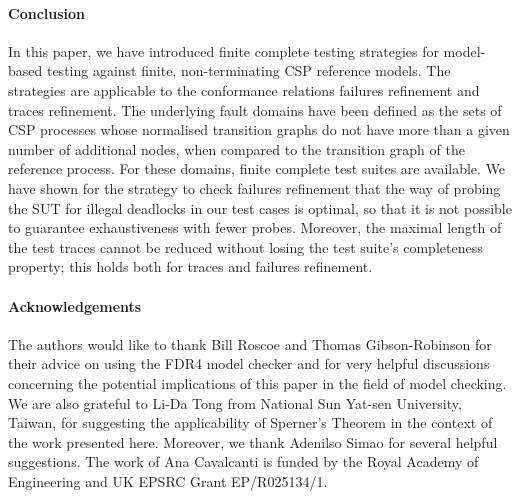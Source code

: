 \documentclass[3p,times]{elsarticle}
\begin{document}
\paragraph{Conclusion}
In this paper, we have introduced finite complete testing strategies for
model-based testing against finite, non-terminating CSP reference models. The
strategies are applicable to the conformance relations failures refinement
and traces refinement. The underlying fault domains have been defined as the
sets of CSP processes whose normalised transition graphs do not have more
than a given number of additional nodes, when compared to the transition
graph of the reference process. For these domains, finite complete test
suites are available. We have shown for the strategy to check failures
refinement that the way of probing the SUT for illegal deadlocks in our test
cases is optimal, so that it is not possible to guarantee exhaustiveness with
fewer probes. Moreover, the maximal length of the test traces cannot be
reduced without losing the test suite's completeness property; this holds
both for traces and failures refinement.


\paragraph{Acknowledgements}
The authors would like to thank Bill Roscoe and Thomas Gibson-Robinson for
their advice on using the FDR4 model checker and for very helpful discussions
concerning the potential implications of this paper in the field of model
checking. We are also grateful to Li-Da Tong from National Sun Yat-sen
University, Taiwan, for suggesting the applicability of Sperner's Theorem in
the context of the work presented here. Moreover, we thank Adenilso Simao for
several helpful suggestions. The work of Ana Cavalcanti is funded by the
Royal Academy of Engineering and UK EPSRC Grant EP/R025134/1.


\end{document}
